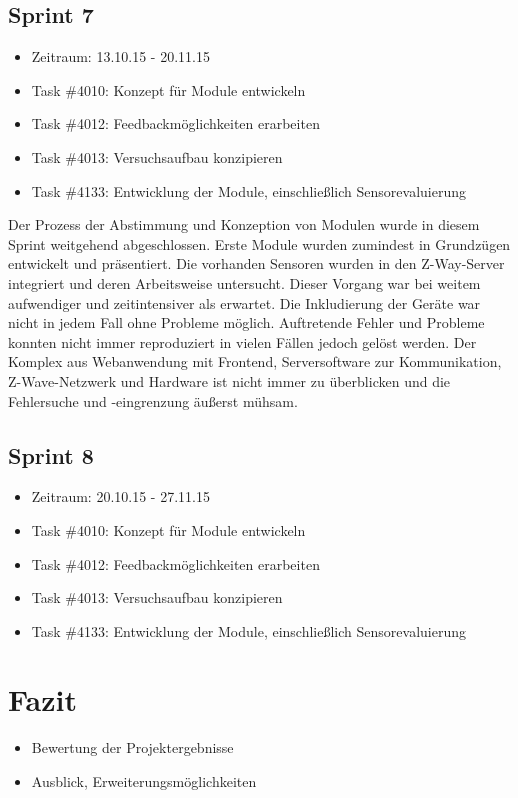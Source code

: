 \documentclass[12pt, oneside, smallheadings]{scrbook}
\begin{document}
\section{Sprint 7}
\begin{itemize}
	\item Zeitraum: 13.10.15 - 20.11.15
	\item Task \#4010: Konzept für Module entwickeln
	\item Task \#4012: Feedbackmöglichkeiten erarbeiten
	\item Task \#4013: Versuchsaufbau konzipieren
	\item Task \#4133: Entwicklung der Module, einschließlich Sensorevaluierung
\end{itemize}
Der Prozess der Abstimmung und Konzeption von Modulen wurde in diesem Sprint weitgehend abgeschlossen. Erste Module wurden zumindest in Grundzügen entwickelt und präsentiert. Die vorhanden Sensoren wurden in den Z-Way-Server integriert und deren Arbeitsweise untersucht. Dieser Vorgang war bei weitem aufwendiger und zeitintensiver als erwartet. Die Inkludierung der Geräte war nicht in jedem Fall ohne Probleme möglich. Auftretende Fehler und Probleme konnten nicht immer reproduziert in vielen Fällen jedoch gelöst werden. Der Komplex aus Webanwendung mit Frontend, Serversoftware zur Kommunikation, Z-Wave-Netzwerk und Hardware ist nicht immer zu überblicken und die Fehlersuche und -eingrenzung äußerst mühsam.

\section{Sprint 8}
\begin{itemize}
	\item Zeitraum: 20.10.15 - 27.11.15
	\item Task \#4010: Konzept für Module entwickeln
	\item Task \#4012: Feedbackmöglichkeiten erarbeiten
	\item Task \#4013: Versuchsaufbau konzipieren
	\item Task \#4133: Entwicklung der Module, einschließlich Sensorevaluierung
\end{itemize}




\chapter{Fazit}
\begin{itemize}
	\item Bewertung der Projektergebnisse
	\item Ausblick, Erweiterungsmöglichkeiten
\end{itemize}
\end{document}
